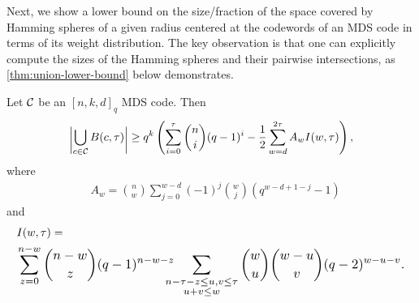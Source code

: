 \documentclass[conference]{IEEEtran}
\begin{document}
Next, we show a lower bound on the size/fraction of the space covered by Hamming spheres of a given radius centered at the codewords of an MDS code in terms of its weight distribution. The key observation is that one can explicitly compute the sizes of the Hamming spheres and their pairwise intersections, as \autoref{thm:union-lower-bound} below demonstrates. 


\begin{theorem}
    \label{thm:union-lower-bound}
    Let ${\mathcal C}$ be an $[n, k, d]_{q}$ MDS code. Then%
    \begin{align*}
        \bigabs{\bigcup_{c \in \CC} B(c, \tau)} 
        \ge q^{k} \left(\sum_{i = 0}^{\tau} \binom{n}{i} (q - 1)^{i} 
        - \frac{1}{2} \sum_{w = d}^{2 \tau} A_{w} I(w, \tau)\right), 
    \end{align*}
    where %
    \begin{align}
        &A_{w} 
        = \binom{n}{w} 
        \sum_{j = 0}^{w - d} (-1)^{j} 
        \binom{w}{j} (q^{w - d + 1 - j} - 1)  \label{eq:weight-distribution} 
    \end{align} 
    and 
    \begin{align}
        & I(w, \tau) = 
        \label{eq:intersection} \\ 
        &\hspace{-1mm} %
        \resizebox{\hsize}{!}{
        $\displaystyle \sum_{z = 0}^{n - w} 
        \binom{n - w}{z} 
        (q - 1)^{n - w - z}
        \hspace{-3mm}
        \sum_{
            \substack{
                n - \tau - z \le u, v \le \tau  
                \\ 
                u + v \le w 
            }
        } \binom{w}{u} 
        \binom{w - u}{v}
        (q - 2)^{w - u - v}$.} 
        \notag 
    \end{align} 
\end{theorem}
\end{document}

